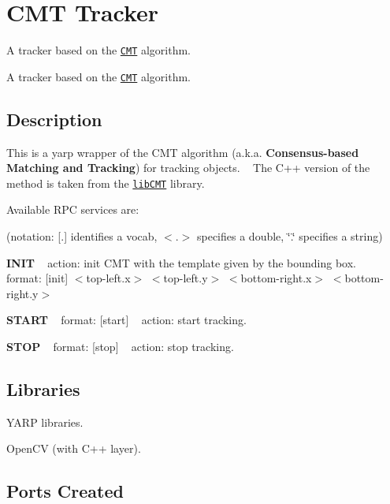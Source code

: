 \section{C\+M\+T Tracker}
\label{group__icub__cmt}


A tracker based on the \href{http://www.gnebehay.com/cmt}{\tt C\+M\+T} algorithm.  


A tracker based on the \href{http://www.gnebehay.com/cmt}{\tt C\+M\+T} algorithm. 

\hypertarget{group__icub__tld_intro_sec}{}\subsection{Description}\label{group__icub__tld_intro_sec}
This is a yarp wrapper of the C\+M\+T algorithm (a.\+k.\+a. {\bfseries Consensus-\/based Matching and Tracking}) for tracking objects. ~\newline
 The C++ version of the method is taken from the \href{https://github.com/delmottea/libCMT}{\tt lib\+C\+M\+T} library.

Available R\+P\+C services are\+:

(notation\+: \mbox{[}.\mbox{]} identifies a vocab, $<$.$>$ specifies a double, \char`\"{}.\char`\"{} specifies a string)

{\bfseries I\+N\+I\+T} ~\newline
action\+: init C\+M\+T with the template given by the bounding box. ~\newline
format\+: \mbox{[}init\mbox{]} $<$top-\/left.\+x$>$ $<$top-\/left.\+y$>$ $<$bottom-\/right.\+x$>$ $<$bottom-\/right.\+y$>$ ~\newline


{\bfseries S\+T\+A\+R\+T} ~\newline
format\+: \mbox{[}start\mbox{]} ~\newline
 action\+: start tracking.

{\bfseries S\+T\+O\+P} ~\newline
format\+: \mbox{[}stop\mbox{]} ~\newline
 action\+: stop tracking.\hypertarget{group__icub__tld_lib_sec}{}\subsection{Libraries}\label{group__icub__tld_lib_sec}

\begin{DoxyItemize}
\item Y\+A\+R\+P libraries.
\item Open\+C\+V (with C++ layer).
\end{DoxyItemize}\hypertarget{group__icub__tld_portsc_sec}{}\subsection{Ports Created}\label{group__icub__tld_portsc_sec}

